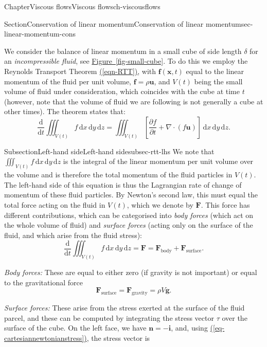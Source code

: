 \documentclass[oneside,10pt,]{book}
\newcommand{\xreffont}{\relax}
\numberwithin{equation}{section}
\newcommand{\de}{\mathrm{d}}
\newcommand{\dd}[2]{\frac{\de#1}{\de#2}}
\newcommand{\pd}[2]{\frac{\partial#1}{\partial#2}}
\newcommand{\bx}{\boldsymbol{x}}
\newcommand{\bn}{\boldsymbol{n}}
\newcommand{\bu}{\boldsymbol{u}}
\renewcommand{\bf}{\boldsymbol{f}}
\newcommand{\bg}{\boldsymbol{g}}
\newcommand{\bF}{\boldsymbol{F}}
\newcommand{\bi}{\boldsymbol{i}}
\begin{document}
\begin{chapterptx}{Chapter}{Viscous flows}{}{Viscous flows}{}{}{ch-viscousflows}
\begin{sectionptx}{Section}{Conservation of linear momentum}{}{Conservation of linear momentum}{}{}{sec-linear-momentum-cons}
\begin{introduction}{}
We consider the balance of linear momentum in a small cube of side length \(\delta\) for an \emph{incompressible fluid}, see \hyperref[fig-small-cube]{Figure~{\xreffont\ref{fig-small-cube}}}. To do this we employ the Reynolds Transport Theorem \hyperref[eqn-RTT]{({\xreffont\ref{eqn-RTT}})}, with \(\bf(\bx,t)\) equal to the linear momentum of the fluid per unit volume, \(\bf=\rho\bu\), and \(V(t)\) being the small volume of fluid under consideration, which coincides with the cube at time \(t\) (however, note that the volume of fluid we are following is not generally a cube at other times). The theorem states that:%
\begin{equation*}
\dd{}{t} \iiint_{V(t)} f \, \de{x} \, \de{y} \, \de{z} = \iiint_{V(t)} \left[
\pd{f}{t} + \nabla \cdot (f\bu)\right] \, \de{x} \, \de{y} \, \de{z}.
\end{equation*}
%
\end{introduction}%
%
%
\typeout{************************************************}
\typeout{************************************************}
%
\begin{subsectionptx}{Subsection}{Left-hand side}{}{Left-hand side}{}{}{subsec-rtt-lhs}
We note that \(\iiint_{V(t)} f \, \de{x} \, \de{y} \, \de{z}\) is the integral of the linear momentum per unit volume over the volume and is therefore the total momentum of the fluid particles in \(V(t)\). The left-hand side of this equation is thus the Lagrangian rate of change of momentum of these fluid particles. By Newton's second law, this must equal the total force acting on the fluid in \(V(t)\), which we denote by \(\bF\). This force has different contributions, which can be categorised into \emph{body forces} (which act on the whole volume of fluid) and \emph{surface forces} (acting only on the surface of the fluid, and which arise from the fluid stress):%
\begin{equation*}
\dd{}{t} \iiint_{V(t)} f \, \de{x} \, \de{y} \, \de{z}
= \bF
= \bF_{\textrm{body}} + \bF_{\textrm{surface}}.
\end{equation*}
%
\par
\emph{Body forces:} These are equal to either zero (if gravity is not important) or equal to the gravitational force%
\begin{equation*}
\bF_{\textrm{surface}}=\bF_{\textrm{gravity}}=\rho V\bg.
\end{equation*}
%
\par
\emph{Surface forces:} These arise from the stress exerted at the surface of the fluid parcel, and these can be computed by integrating the stress vector \(\tau\) over the surface of the cube. On the left face, we have \(\bn=-\bi\), and, using  \hyperref[eq-cartesiannewtonianstress]{({\xreffont\ref{eq-cartesiannewtonianstress}})}, the stress vector is%

\end{subsectionptx}
\end{sectionptx}
\end{chapterptx}
\end{document}
